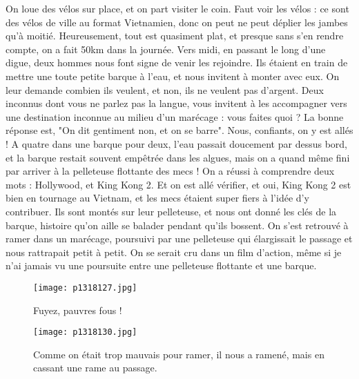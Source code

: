 \documentclass{book}
\begin{document}
On loue des vélos sur place, et on part visiter le coin. Faut voir les vélos : ce sont des vélos de ville au format Vietnamien, donc on peut ne peut déplier les jambes qu'à moitié. Heureusement, tout est quasiment plat, et presque sans s'en rendre compte, on a fait 50km dans la journée. Vers midi, en passant le long d'une digue, deux hommes nous font signe de venir les rejoindre. Ils étaient en train de mettre une toute petite barque à l'eau, et nous invitent à monter avec eux. On leur demande combien ils veulent, et non, ils ne veulent pas d'argent. Deux inconnus dont vous ne parlez pas la langue, vous invitent à les accompagner vers une destination inconnue au milieu d'un marécage : vous faites quoi ? La bonne réponse est, "On dit gentiment non, et on se barre". Nous, confiants, on y est allés ! A quatre dans une barque pour deux, l'eau passait doucement par dessus bord, et la barque restait souvent empêtrée dans les algues, mais on a quand même fini par arriver à la pelleteuse flottante des mecs ! On a réussi à comprendre deux mots : Hollywood, et King Kong 2. Et on est allé vérifier, et oui, King Kong 2 est bien en tournage au Vietnam, et les mecs étaient super fiers à l'idée d'y contribuer. Ils sont montés sur leur pelleteuse, et nous ont donné les clés de la barque, histoire qu'on aille se balader pendant qu'ils bossent. On s'est retrouvé à ramer dans un marécage, poursuivi par une pelleteuse qui élargissait le passage et nous rattrapait petit à petit. On se serait cru dans un film d'action, même si je n'ai jamais vu une poursuite entre une pelleteuse flottante et une barque.


\begin{figure}[h]
\centering
\texttt{[image: p1318127.jpg]}
\caption*{Fuyez, pauvres fous !}
\end{figure}


\begin{figure}[h]
\centering
\texttt{[image: p1318130.jpg]}
\caption*{Comme on était trop mauvais pour ramer, il nous a ramené, mais en cassant une rame au passage.}
\end{figure}
\end{document}
